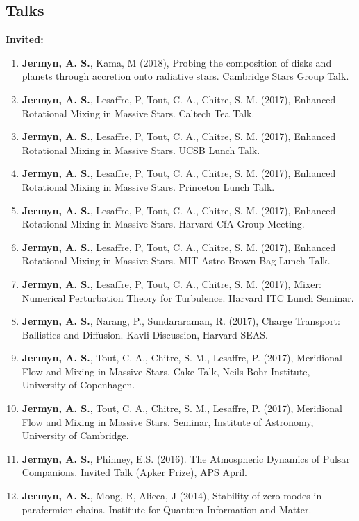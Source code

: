 \documentclass[line, margin]{res3address}
\begin{document}
\begin{resume}
\section{Talks}
\textbf{Invited:}
\begin{enumerate}[leftmargin=10pt]
\item \textbf{Jermyn, A. S.}, Kama, M (2018), Probing the composition of disks and planets through accretion onto radiative stars. Cambridge Stars Group Talk.
\item \textbf{Jermyn, A. S.}, Lesaffre, P, Tout, C. A., Chitre, S. M.  (2017), Enhanced Rotational Mixing in Massive Stars. Caltech Tea Talk.
\item \textbf{Jermyn, A. S.}, Lesaffre, P, Tout, C. A., Chitre, S. M.  (2017), Enhanced Rotational Mixing in Massive Stars. UCSB Lunch Talk.
\item \textbf{Jermyn, A. S.}, Lesaffre, P, Tout, C. A., Chitre, S. M.  (2017), Enhanced Rotational Mixing in Massive Stars. Princeton Lunch Talk.
\item \textbf{Jermyn, A. S.}, Lesaffre, P, Tout, C. A., Chitre, S. M.  (2017), Enhanced Rotational Mixing in Massive Stars. Harvard CfA Group Meeting.
\item \textbf{Jermyn, A. S.}, Lesaffre, P, Tout, C. A., Chitre, S. M.  (2017), Enhanced Rotational Mixing in Massive Stars. MIT Astro Brown Bag Lunch Talk.
\item \textbf{Jermyn, A. S.}, Lesaffre, P, Tout, C. A., Chitre, S. M.  (2017), Mixer: Numerical Perturbation Theory for Turbulence. Harvard ITC Lunch Seminar.
\item \textbf{Jermyn, A. S.}, Narang, P., Sundararaman, R.  (2017), Charge Transport: Ballistics and Diffusion. Kavli Discussion, Harvard SEAS.
\item \textbf{Jermyn, A. S.}, Tout, C. A., Chitre, S. M., Lesaffre, P. (2017), Meridional Flow and Mixing in Massive Stars. Cake Talk, Neils Bohr Institute, University of Copenhagen.
\item \textbf{Jermyn, A. S.}, Tout, C. A., Chitre, S. M., Lesaffre, P. (2017), Meridional Flow and Mixing in Massive Stars. Seminar, Institute of Astronomy, University of Cambridge.
\item \textbf{Jermyn, A. S.}, Phinney, E.S. (2016). The Atmospheric Dynamics of Pulsar Companions. Invited Talk (Apker Prize), APS April.
\item \textbf{Jermyn, A. S.}, Mong, R, Alicea, J (2014), Stability of zero-modes in parafermion chains. Institute for Quantum Information and Matter.

\end{enumerate}
\end{resume}
\end{document}
